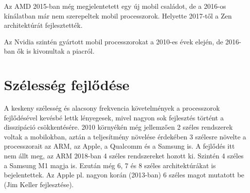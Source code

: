 Az AMD 2015-ban még megjelentetett egy új mobil családot, de a 2016-os kínálatban már nem szerepeltek mobil processzorok.
Helyette 2017-től a Zen architektúrát fejlesztették.

Az Nvidia szintén gyártott mobil processzorokat a 2010-es évek elején, de 2016-ban ők is kivonultak a piacról.

\section{Szélesség fejlődése}
A keskeny szélesség és alacsony frekvencia követelmények a processzorok fejlődésével kevésbé lettk lényegesek, mivel nagyon sok fejlesztés történt a disszipáció csökkentésére.
2010 környékén még jellemzően 2 széles rendszerek voltak a mobilokban, aztán a teljesítmény növelése érdekében 3 szélesre növelte a processzorait az ARM, az Apple, a Qualcomm és a Samsung is.
A fejlődés itt nem állt meg, az ARM 2018-ban 4 széles rendszereket hozott ki.
Szintén 4 széles a Samsung M1 magja is.
Ezután még 6, 7 és 8 széles architektúrákat is bejelentettek.
Az Apple pl. nagyon korán (2013-ban) 6 széles magot mutatott be (Jim Keller fejlesztése).